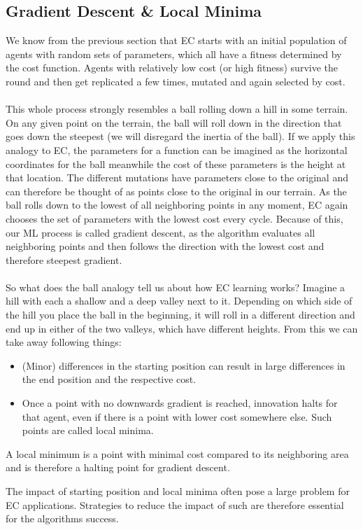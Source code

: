 \documentclass[11pt]{report}
\newcommand{\mydeflabel}{}
\newenvironment{mydef}[1]
 {\renewcommand\mydeflabel{#1}\begin{mydefinner}}
 {\end{mydefinner}}
\begin{document}
            \subsection{Gradient Descent \& Local Minima}\label{subsec:gradient-descent}
    We know from the previous section that EC starts with an initial population of agents with random sets of parameters, which all have a fitness determined by the cost function.
    Agents with relatively low cost (or high fitness) survive the round and then get replicated a few times, mutated and again selected by cost.
    \\ \\
    This whole process strongly resembles a ball rolling down a hill in some terrain.
    On any given point on the terrain, the ball will roll down in the direction that goes down the steepest (we will disregard the inertia of the ball).
    If we apply this analogy to EC, the parameters for a function can be imagined as the horizontal coordinates for the ball meanwhile the cost of these parameters is the height at that location.
    The different mutations have parameters close to the original and can therefore be thought of as points close to the original in our terrain.
    As the ball rolls down to the lowest of all neighboring points in any moment, EC again chooses the set of parameters with the lowest cost every cycle.
    Because of this, our ML process is called gradient descent, as the algorithm evaluates all neighboring points and then follows the direction with the lowest cost and therefore steepest gradient.
    \\ \\
    So what does the ball analogy tell us about how EC learning works?
    Imagine a hill with each a shallow and a deep valley next to it.
    Depending on which side of the hill you place the ball in the beginning, it will roll in a different direction and end up in either of the two valleys, which have different heights.
    From this we can take away following things:
    \begin{itemize}
        \item (Minor) differences in the starting position can result in large differences in the end position and the respective cost.
        \item Once a point with no downwards gradient is reached, innovation halts for that agent, even if there is a point with lower cost somewhere else.
        Such points are called local minima.
    \end{itemize}
    \begin{mydef}{Local Minimum}
        A local minimum is a point with minimal cost compared to its neighboring area and is therefore a halting point for gradient descent.
    \end{mydef}
    The impact of starting position and local minima often pose a large problem for EC applications.
    Strategies to reduce the impact of such are therefore essential for the algorithms success.
\end{document}
